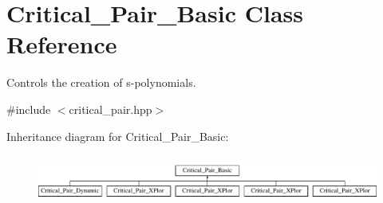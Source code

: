 \hypertarget{class_critical___pair___basic}{}\section{Critical\+\_\+\+Pair\+\_\+\+Basic Class Reference}
\label{class_critical___pair___basic}


Controls the creation of s-\/polynomials.  




{\ttfamily \#include $<$critical\+\_\+pair.\+hpp$>$}

Inheritance diagram for Critical\+\_\+\+Pair\+\_\+\+Basic\+:\begin{figure}[H]
\begin{center}
\leavevmode
\includegraphics[height=1.534247cm]{class_critical___pair___basic}
\end{center}
\end{figure}

